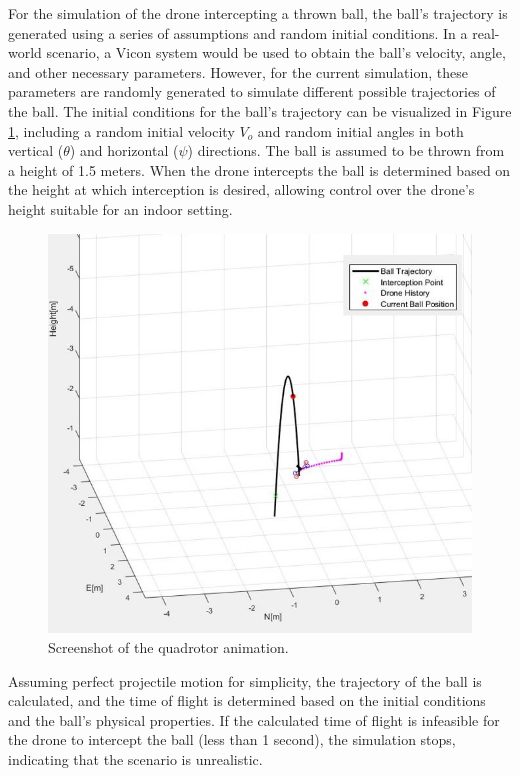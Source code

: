 \documentclass{UoNMCHA}
\numberwithin{equation}{section}
\begin{document}
For the simulation of the drone intercepting a thrown ball, the ball's trajectory is generated using a series of assumptions and random initial conditions. In a real-world scenario, a Vicon system would be used to obtain the ball's velocity, angle, and other necessary parameters. However, for the current simulation, these parameters are randomly generated to simulate different possible trajectories of the ball.
The initial conditions for the ball's trajectory can be visualized in Figure \ref{fig:Projectilemotion}, including a random initial velocity \(V_o\) and random initial angles in both vertical (\(\theta\)) and horizontal (\(\psi\)) directions. The ball is assumed to be thrown from a height of 1.5 meters. When the drone intercepts the ball is determined based on the height at which interception is desired, allowing control over the drone's height suitable for an indoor setting.



\newpage
\begin{figure}[H]
    \centering
    \includegraphics[width=1\linewidth]{Figures/animationwithlegend.JPG}
    \caption{Screenshot of the quadrotor animation.}
    \label{fig:Projectilemotion} %
\end{figure}

Assuming perfect projectile motion for simplicity, the trajectory of the ball is calculated, and the time of flight is determined based on the initial conditions and the ball's physical properties. If the calculated time of flight is infeasible for the drone to intercept the ball (less than 1 second), the simulation stops, indicating that the scenario is unrealistic.
\end{document}
